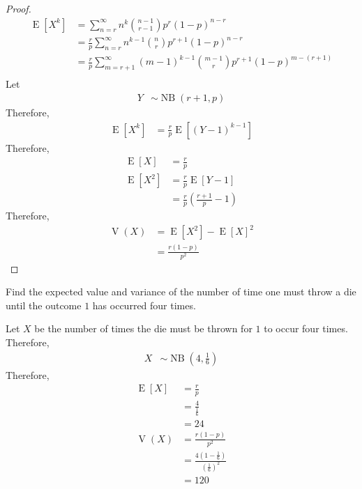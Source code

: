 \documentclass[titlepage, fleqn, a4paper, 12pt, twoside]{article}
\theoremstyle{definition}
\theoremstyle{theorem}
\DeclareMathOperator{\expct}{\mathrm{E}}
\DeclareMathOperator{\var}{\mathrm{V}}
\DeclareMathOperator{\nb}{\mathrm{NB}}
\begin{document}
\begin{proof}
	\begin{align*}
		\expct\left[ X^k \right] & = \sum\limits_{n = r}^{\infty} n^k \binom{n - 1}{r - 1} p^r (1 - p)^{n - r}                                     \\
                                         & = \frac{r}{p} \sum\limits_{n = r}^{\infty} n^{k - 1} \binom{n}{r} p^{r + 1} (1 - p)^{n - r}                     \\
                                         & = \frac{r}{p} \sum\limits_{m = r + 1}^{\infty} (m - 1)^{k - 1} \binom{m - 1}{r} p^{r + 1} (1 - p)^{m - (r + 1)} \\
	\end{align*}
	Let
	\begin{align*}
		Y & \sim \nb(r + 1,p)
	\end{align*}
	Therefore,
	\begin{align*}
		\expct\left[ X^k \right] & = \frac{r}{p} \expct\left[ (Y - 1)^{k - 1} \right]
	\end{align*}
	Therefore,
	\begin{align*}
		\expct[X]                & = \frac{r}{p}               \\
		\expct\left[ X^2 \right] & = \frac{r}{p} \expct[Y - 1] \\
                                         & = \frac{r}{p} \left( \frac{r + 1}{p} - 1 \right)
	\end{align*}
	Therefore,
	\begin{align*}
		\var(X) & = \expct\left[ X^2 \right] - \expct[X]^2 \\
                        & = \frac{r (1 - p)}{p^2}
	\end{align*}
\end{proof}

\begin{question}
	Find the expected value and variance of the number of time one must throw a die until the outcome $1$ has occurred four times.
\end{question}

\begin{solution}
	Let $X$ be the number of times the die must be thrown for $1$ to occur four times.
	Therefore,
	\begin{align*}
		X & \sim \nb\left( 4,\frac{1}{6} \right)
	\end{align*}
	Therefore,
	\begin{align*}
		\expct[X] & = \frac{r}{p}                                                           \\
                          & = \frac{4}{\frac{1}{6}}                                                 \\
                          & = 24                                                                    \\
		\var(X)   & = \frac{r (1 - p)}{p^2}                                                 \\
                          & = \frac{4 \left( 1 - \frac{1}{6} \right)}{\left( \frac{1}{6} \right)^2} \\
                          & = 120
	\end{align*}
\end{solution}
\end{document}
